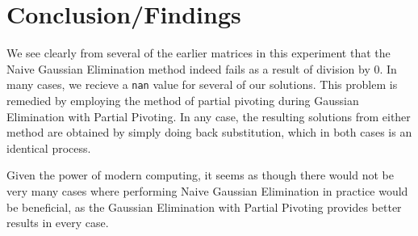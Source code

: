 \documentclass[letterpaper,10pt,titlepage]{report}
\begin{document}
\section{Conclusion/Findings}
We see clearly from several of the earlier matrices in this experiment that the
Naive Gaussian Elimination method indeed fails as a result of division by 0. In
many cases, we recieve a \texttt{nan} value for several of our solutions. This
problem is remedied by employing the method of partial pivoting during Gaussian
Elimination with Partial Pivoting. In any case, the resulting solutions from
either method are obtained by simply doing back substitution, which in both
cases is an identical process.

Given the power of modern computing, it seems as though there would not be very
many cases where performing Naive Gaussian Elimination in practice would be
beneficial, as the Gaussian Elimination with Partial Pivoting provides better
results in every case.
\end{document}

